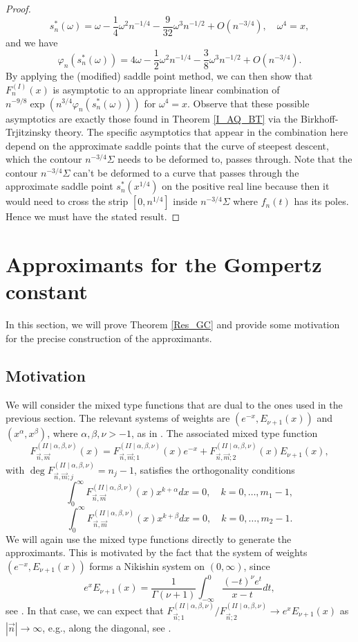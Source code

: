\documentclass[a4paper,12pt,oneside]{article}
\theoremstyle{definition}
\newcommand{\p}{\varphi}
\newcommand{\sz}[1]{\left| \vec{#1} \right|}
\begin{document}
\begin{proof}
    $$s^\ast_n(\omega) = \omega - \frac{1}{4} \omega^2 n^{-1/4} - \frac{9}{32} \omega^3 n^{-1/2} + O(n^{-3/4}),\quad \omega^4=x, $$
and we have
$$\p_n(s^\ast_n(\omega)) = 4\omega -\frac{1}{2} \omega^2 n^{-1/4} - \frac{3}{8} \omega^3 n^{-1/2} + O(n^{-3/4}). $$
By applying the (modified) saddle point method, we can then show that $F_n^{(I)}(x)$ is asymptotic to an appropriate linear combination of $n^{-9/8}\exp\left(n^{3/4}\p_n(s^\ast_n(\omega))\right)$ for $\omega^4=x$. Observe that these possible asymptotics are exactly those found in Theorem \ref{I_AQ_BT} via the Birkhoff-Trjitzinsky theory. The specific asymptotics that appear in the combination here depend on the approximate saddle points that the curve of steepest descent, which the contour $n^{-3/4}\Sigma$ needs to be deformed to, passes through. Note that the contour $n^{-3/4}\Sigma$ can't be deformed to a curve that passes through the approximate saddle point $s_n^\ast(x^{1/4})$ on the positive real line because then it would need to cross the strip $[0,n^{1/4}]$ inside $n^{-3/4}\Sigma$ where $f_n(t)$ has its poles. Hence we must have the stated result. 
\end{proof}



\section{Approximants for the Gompertz constant}

In this section, we will prove Theorem \ref{Res_GC} and provide some motivation for the precise construction of the approximants.

\subsection{Motivation} \label{GC_mot}

We will consider the mixed type functions that are dual to the ones used in the previous section. The relevant systems of weights are $(e^{-x},E_{\nu+1}(x))$ and $(x^{\alpha},x^{\beta})$, where $\alpha,\beta,\nu>-1$, as in \cite[Section 4.1]{VAWolfs}. The associated mixed type function 
$$F_{\vec{n},\vec{m}}^{(II\mid \alpha,\beta,\nu)}(x) = F_{\vec{n},\vec{m};1}^{(II\mid \alpha,\beta,\nu)}(x) e^{-x} + F_{\vec{n},\vec{m};2}^{(II\mid \alpha,\beta,\nu)}(x) E_{\nu+1}(x),$$
with $\deg F_{\vec{n},\vec{m};j}^{(II\mid \alpha,\beta,\nu)} = n_j-1 $, satisfies the orthogonality conditions
    $$ \int_0^\infty F_{\vec{n},\vec{m}}^{(II\mid \alpha,\beta,\nu)}(x) x^{k+\alpha} dx = 0,\quad k=0,\dots,m_1-1, $$
    $$ \int_0^\infty F_{\vec{n},\vec{m}}^{(II\mid \alpha,\beta,\nu)}(x) x^{k+\beta} dx = 0,\quad k=0,\dots,m_2-1. $$
We will again use the mixed type functions directly to generate the approximants. This is motivated by the fact that the system of weights $(e^{-x},E_{\nu+1}(x))$ forms a Nikishin system on $(0,\infty)$, since
    $$e^{x} E_{\nu+1}(x) = \frac{1}{\Gamma(\nu+1)} \int_{-\infty}^0 \frac{(-t)^\nu e^{t}}{x-t} dt, $$
see \cite[Eq. 3.383.10]{DLMF}. In that case, we can expect that $F_{\vec{n};1}^{(II\mid \alpha,\beta,\nu)}/F_{\vec{n};2}^{(II\mid \alpha,\beta,\nu)} \to e^{x} E_{\nu+1}(x)$ as $\sz{n}\to\infty$, e.g., along the diagonal, see \cite[Theorem 1.4]{Lop-Per}.
\medbreak
\end{document}
